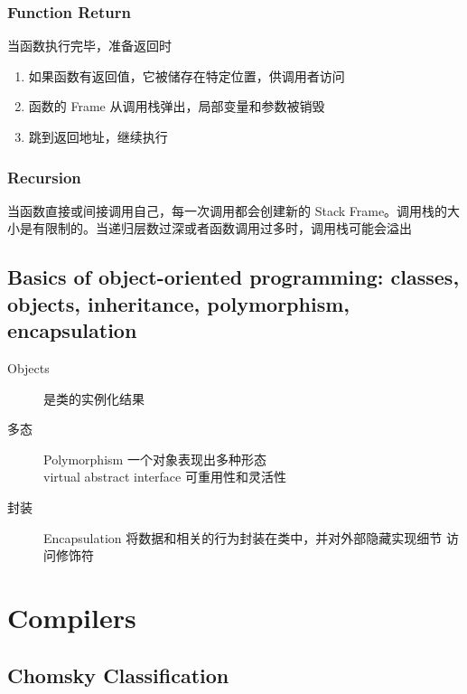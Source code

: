 \documentclass[11pt,journal,compsoc]{IEEEtran}
\begin{document}
\subsubsection{Function Return}

当函数执行完毕，准备返回时

\begin{enumerate}
    \item 如果函数有返回值，它被储存在特定位置，供调用者访问
    \item 函数的 Frame 从调用栈弹出，局部变量和参数被销毁
    \item 跳到返回地址，继续执行
\end{enumerate}


\subsubsection{Recursion}

当函数直接或间接调用自己，每一次调用都会创建新的 Stack Frame。调用栈的大小是有限制的。当递归层数过深或者函数调用过多时，调用栈可能会溢出


\subsection{Basics of object-oriented programming: classes, objects, inheritance, polymorphism, encapsulation}

\begin{description}
    \item[Objects] 是类的实例化结果

    \item[多态] Polymorphism 一个对象表现出多种形态 \\ virtual abstract interface 可重用性和灵活性

    \item[封装] Encapsulation 将数据和相关的行为封装在类中，并对外部隐藏实现细节 访问修饰符
\end{description}


\section{Compilers}


\subsection{Chomsky Classification}
\end{document}
